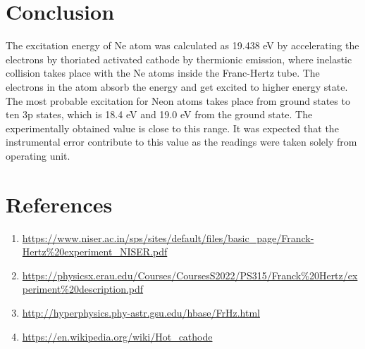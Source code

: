 \documentclass[a4paper, amsfonts, amssymb, amsmath, reprint, showkeys, nofootinbib, twoside]{revtex4-1}
\begin{document}
\section{Conclusion}
The excitation energy of Ne atom was calculated as 19.438 eV by accelerating the electrons by thoriated activated cathode by thermionic emission, where inelastic collision takes place with the Ne atoms inside the Franc-Hertz tube. The electrons in the atom absorb the energy and get excited to higher energy state. The most probable excitation for Neon atoms takes place from ground states to ten 3p states, which is 18.4 eV and 19.0 eV from the ground state. The experimentally obtained value is close to this range. It was expected that the instrumental error contribute to this value as the readings were taken solely from operating unit.

\section{References}
\begin{enumerate}
\item{\url{https://www.niser.ac.in/sps/sites/default/files/basic_page/Franck-Hertz%20experiment_NISER.pdf}}
\item{\url{https://physicsx.erau.edu/Courses/CoursesS2022/PS315/Franck%20Hertz/experiment%20description.pdf}}
\item{\url{http://hyperphysics.phy-astr.gsu.edu/hbase/FrHz.html}}
\item{\url{https://en.wikipedia.org/wiki/Hot_cathode}}


\end{enumerate}
\end{document}
